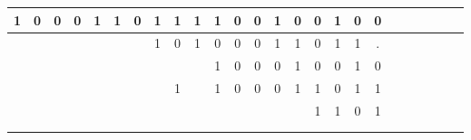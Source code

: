 \begin{problem}
\begin{enumerate}
\begin{Answer}
\color{zaffre}
\begin{tabular}{c@{\,}c@{\,}c@{\,}c@{\,}c@{\,}c@{\,}c@{\,}c@{\,}c@{\,} | c@{\,}c@{\,}c@{\,}c@{\,}c@{\,}c@{\,}c@{\,}c@{\,}c@{\,}c@{\,}c@{\,}c@{\,}c@{\,}c@{\,}c@{\,}c@{\,}}
  1 & 0 & 0 & 0 & 1 & 1 & 0 & 1 & 1     & 1 & 1 & 0 & 0 & 1 & 0 & 0 & 1 & 0 & 0\\
\hline{}
    &   &   &   &   &   &   & 1 & 0     & 1 & 0 & 0 & 0 & 1 & 1 & 0 & 1 & 1 &. \\
    &   &   &   &   &   &   &   &       &   & 1 & 0 & 0 & 0 & 1 & 0 & 0 & 1 & 0\\
    &   &   &   &   &   &   &   & 1     &   & 1 & 0 & 0 & 0 & 1 & 1 & 0 & 1 & 1\\
\hline{}
    &   &   &   &   &   &   &   &       &   &   &   &   &   &   & 1 & 1 & 0 & 1\\
\\
\\
\end{tabular}
\color{black}
\end{Answer}
\end{enumerate}
\end{problem}

